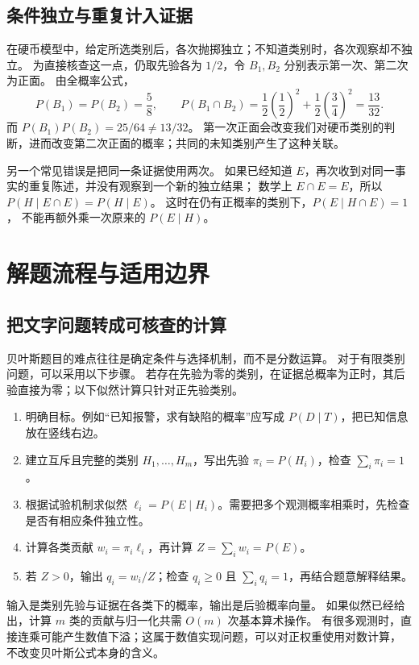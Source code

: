 \documentclass[UTF8]{ctexart}
\begin{document}
\subsection{条件独立与重复计入证据}

在硬币模型中，给定所选类别后，各次抛掷独立；不知道类别时，各次观察却不独立。
为直接核查这一点，仍取先验各为 $1/2$，令 $B_1,B_2$ 分别表示第一次、第二次为正面。
由全概率公式，
\[
  P(B_1)=P(B_2)=\frac58,\qquad
  P(B_1\cap B_2)=\frac12\left(\frac12\right)^2+
  \frac12\left(\frac34\right)^2=\frac{13}{32}.
\]
而 $P(B_1)P(B_2)=25/64\ne13/32$。
第一次正面会改变我们对硬币类别的判断，进而改变第二次正面的概率；共同的未知类别产生了这种关联。

另一个常见错误是把同一条证据使用两次。
如果已经知道 $E$，再次收到对同一事实的重复陈述，并没有观察到一个新的独立结果；
数学上 $E\cap E=E$，所以 $P(H\mid E\cap E)=P(H\mid E)$。
这时在仍有正概率的类别下，$P(E\mid H\cap E)=1$，
不能再额外乘一次原来的 $P(E\mid H)$。

\section{解题流程与适用边界}
\label{sec:bayes-method}

\subsection{把文字问题转成可核查的计算}

贝叶斯题目的难点往往是确定条件与选择机制，而不是分数运算。
对于有限类别问题，可以采用以下步骤。
若存在先验为零的类别，在证据总概率为正时，其后验直接为零；以下似然计算只针对正先验类别。
\begin{enumerate}
  \item 明确目标。例如“已知报警，求有缺陷的概率”应写成 $P(D\mid T)$，把已知信息放在竖线右边。
  \item 建立互斥且完整的类别 $H_1,\ldots,H_m$，写出先验 $\pi_i=P(H_i)$，检查 $\sum_i\pi_i=1$。
  \item 根据试验机制求似然 $\ell_i=P(E\mid H_i)$。需要把多个观测概率相乘时，先检查是否有相应条件独立性。
  \item 计算各类贡献 $w_i=\pi_i\ell_i$，再计算 $Z=\sum_iw_i=P(E)$。
  \item 若 $Z>0$，输出 $q_i=w_i/Z$；检查 $q_i\geq0$ 且 $\sum_iq_i=1$，再结合题意解释结果。
\end{enumerate}
输入是类别先验与证据在各类下的概率，输出是后验概率向量。
如果似然已经给出，计算 $m$ 类的贡献与归一化共需 $O(m)$ 次基本算术操作。
有很多观测时，直接连乘可能产生数值下溢；这属于数值实现问题，可以对正权重使用对数计算，
不改变贝叶斯公式本身的含义。
\end{document}
